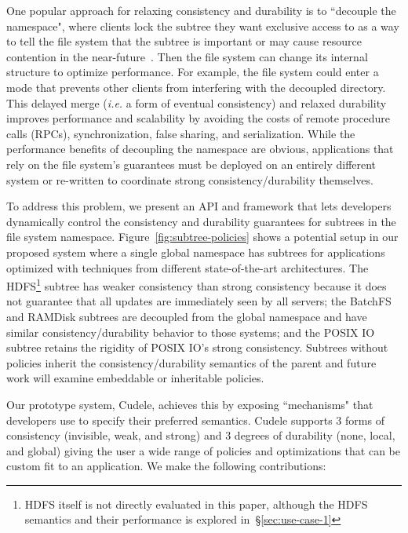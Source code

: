 One popular approach for relaxing consistency and durability is to ``decouple
the namespace", where clients lock the subtree they want exclusive access to as
a way to tell the file system that the subtree is important or may cause
resource contention in the near-future~\cite{grider:pdsw2015-marfs,
zheng:pdsw2015-deltafs, zheng:pdsw2014-batchfs, ren:sc2014-indexfs,
bent:slides-twotiers}. Then the file system can change its internal structure
to optimize performance. For example, the file system could enter a mode that
prevents other clients from interfering with the decoupled directory.  This
delayed merge ({\it i.e.} a form of eventual consistency) and relaxed
durability improves performance and scalability by avoiding the costs of remote
procedure calls (RPCs), synchronization, false sharing, and serialization.
While the performance benefits of decoupling the namespace are obvious,
applications that rely on the file system's guarantees must be deployed on an
entirely different system or re-written to coordinate strong
consistency/durability themselves.

To address this problem, we present an API and framework that lets developers
dynamically control the consistency and durability guarantees for subtrees in
the file system namespace.  Figure~\ref{fig:subtree-policies} shows a potential
setup in our proposed system where a single global namespace has subtrees for
applications optimized with techniques from different state-of-the-art
architectures.  The HDFS\footnote{HDFS itself is not directly evaluated in this
paper, although the HDFS semantics and their performance is explored
in~\S\ref{sec:use-case-1}} subtree has weaker consistency than strong
consistency because it does not guarantee that all updates are immediately seen
by all servers; the BatchFS and RAMDisk subtrees are decoupled from the global
namespace and have similar consistency/durability behavior to those systems;
and the POSIX IO subtree retains the rigidity of POSIX IO's strong consistency.
Subtrees without policies inherit the consistency/durability semantics of the
parent and future work will examine embeddable or inheritable policies.

Our prototype system, Cudele, achieves this by exposing ``mechanisms" that
developers use to specify their preferred semantics.  Cudele supports 3 forms
of consistency (invisible, weak, and strong) and 3 degrees of durability (none,
local, and global) giving the user a wide range of policies and optimizations
that can be custom fit to an application. We make the following contributions:

